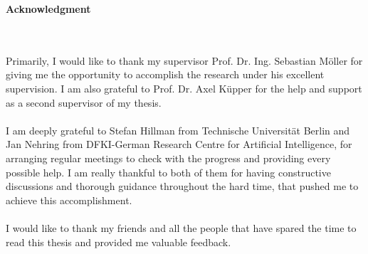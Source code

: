 \thispagestyle{empty}
\vspace*{3cm}

\begin{center}
\textbf{Acknowledgment}
\end{center}

\vspace*{0.5cm}
\\~\\
Primarily, I would like to thank my supervisor Prof. Dr. Ing. Sebastian Möller for giving me the opportunity to accomplish the research under his excellent supervision. I am also grateful to Prof. Dr. Axel Küpper for the help and support as a second supervisor of my thesis.
\\~\\
I am deeply grateful to Stefan Hillman from Technische Universität Berlin and Jan Nehring from DFKI-German Research Centre for Artificial Intelligence, for arranging regular meetings to check with the progress and providing every possible help. I am really thankful to both of them for having constructive discussions and thorough guidance throughout the hard time, that pushed me to achieve this accomplishment.
\\~\\
I would like to thank my friends and all the people that have spared the time to read this thesis and provided me valuable feedback.